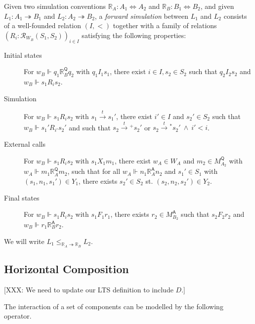 \documentclass[sigplan,10pt,review,anonymous]{acmart}
\newcommand{\kw}[1]{\ensuremath{ \mathsf{#1} }}
\begin{document}
\begin{definition}
Given
two simulation conventions
$\mathbb{R}_A : A_1 \Leftrightarrow A_2$ and
$\mathbb{R}_B : B_1 \Leftrightarrow B_2$,
and given
$L_1 : A_1 \twoheadrightarrow B_1$ and
$L_2 : A_2 \twoheadrightarrow B_2$,
a \emph{forward simulation} between $L_1$ and $L_2$
consists of a
well-founded relation $(I, <)$
together with a family of relations
$(R_i : \mathcal{R}_{W_B}(S_1, S_2))_{i \in I}$
satisfying the following properties:
\begin{description}
\item[Initial states]
  For
  $w_B \Vdash q_1 \mathrel{\mathbb{R}_B^\kw{Q}} q_2$
  with $q_1 \mathrel{I_1} s_1$,
  there exist $i \in I, s_2 \in S_2$
  such that $q_2 \mathrel{I_2} s_2$ and
  $w_B \Vdash s_1 \mathrel{R_i} s_2$.
\item[Simulation]
  For $w_B \Vdash s_1 \mathrel{R_i} s_2$
  with $s_1 \stackrel{t}{\rightarrow} s_1'$,
  there exist $i' \in I$ and $s_2' \in S_2$
  such that $w_B \Vdash s_1' \mathrel{R_{i'}} s_2'$ and
  such that
    $s_2 \mathrel{\stackrel{t}{\rightarrow}{\!\!}^+} s_2'$ or
    $s_2 \mathrel{\stackrel{t}{\rightarrow}{\!\!}^*} s_2' \:\wedge\: i' < i$.
\item[External calls]
  For $w_B \Vdash s_1 \mathrel{R_i} s_2$
  with $s_1 \mathrel{X_1} m_1$,
  there exist $w_A \in W_A$ and $m_2 \in M_{A_2}^\kw{Q}$
  with $w_A \Vdash m_1 \mathrel{\mathbb{R}_A^\kw{Q}} m_2$,
  such that for all
  $w_A \Vdash n_1 \mathrel{\mathbb{R}_A^\kw{A}} n_2$
  and $s_1' \in S_1$ with $(s_1, n_1, s_1') \in Y_1$,
  there exists $s_2' \in S_2$ st.
  $(s_2, n_2, s_2') \in Y_2$.
\item[Final states]
  For $w_B \Vdash s_1 \mathrel{R_i} s_2$
  with $s_1 \mathrel{F_1} r_1$,
  there exists $r_2 \in M_{B_2}^\kw{A}$ such that
  $s_2 \mathrel{F_2} r_2$ and $w_B \Vdash r_1 \mathrel{\mathbb{R}_B^\kw{A}} r_2$.
\end{description}
We will write $L_1 \le_{\mathbb{R}_A \twoheadrightarrow \mathbb{R}_B} L_2$.
\end{definition}


\subsection{Horizontal Composition} \label{sec:sem:linker} %

[XXX: We need to update our LTS definition to include $D$.]

The interaction of a set of components
can be modelled by the following operator.
\end{document}

